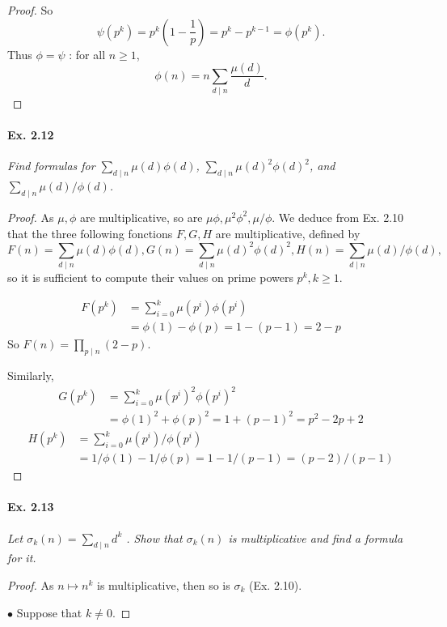 \documentclass[11pt,a4paper]{article}
\begin{document}
{\begin{proof}
So $$\psi(p^k) = p^k\left(1 - \frac{1}{p} \right) = p^k - p^{k-1} = \phi(p^k).$$
Thus $\phi = \psi$ : for all $n\geq 1$,
$$\phi(n) =  n \sum_{d\mid n} \frac{\mu(d)}{d}.$$
\end{proof}

\paragraph{Ex. 2.12}

{\it Find formulas for $\sum_{d\mid n} \mu(d)\phi(d)$, $\sum_{d \mid n} \mu(d)^2\phi(d)^2$, and $\sum_{d\mid n} \mu(d)/\phi(d)$.
}

\begin{proof}
As $\mu,\phi$ are multiplicative, so are $\mu \phi, \mu^2\phi^2 ,\mu/\phi$. We deduce from Ex. 2.10 that the three following fonctions $F,G,H$ are multiplicative, defined by
$$F(n) = \sum_{d\mid n} \mu(d)\phi(d), G(n) = \sum_{d \mid n} \mu(d)^2\phi(d)^2, H(n) = \sum_{d\mid n} \mu(d)/\phi(d),$$so it is sufficient to compute their values on prime powers $p^k, k\geq 1$.

\begin{align*}
F(p^k) &= \sum_{i=0}^k \mu(p^i)\phi(p^i)\\
&= \phi(1) - \phi(p)  = 1 - (p-1) = 2-p
\end{align*}
So $F(n) = \prod_{p\mid n} (2-p)$.

Similarly,
\begin{align*}
G(p^k) &= \sum_{i=0}^k \mu(p^i)^2\phi(p^i)^2\\
&= \phi(1)^2 + \phi(p)^2 = 1 + (p-1)^2 = p^2-2p +2
\end{align*}
\begin{align*}
H(p^k) &=  \sum_{i=0}^k \mu(p^i)/\phi(p^i)\\
&= 1/\phi(1) -1/\phi(p) = 1 - 1/(p-1) = (p-2)/(p-1)
\end{align*}
\end{proof}

\paragraph{Ex. 2.13}

{\it Let $\sigma_k(n) = \sum_{d\mid n} d^k$ . Show that $\sigma_k(n)$ is multiplicative and find a formula for it.
}

\begin{proof}
As $n \mapsto n^k$ is multiplicative, then so is $\sigma_k$ (Ex. 2.10).

$\bullet$ Suppose that $k \ne 0$.


\end{proof}}
\end{document}
